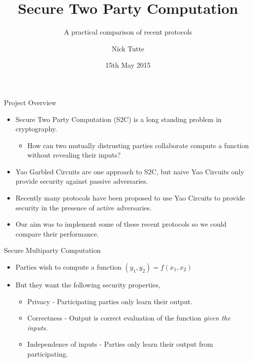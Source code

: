 \documentclass[t, 12pt]{beamer}            %
\title[Secure Two Party Computation]{Secure Two Party Computation}
\subtitle{A practical comparison of recent protocols}
\author{Nick Tutte}
\institute{University of Bristol}
\date{15th May 2015}
\begin{document}
\titlepage

\begin{frame}{Project Overview}
	\begin{itemize} %
		\item Secure Two Party Computation (S2C) is a long standing problem in cryptography.
		\begin{itemize}
			\item How can two mutually distrusting parties collaborate compute a function without revealing their inputs?
		\end{itemize}
		\item Yao Garbled Circuits are one approach to S2C, but naive Yao Circuits only provide security against passive adversaries. 
		\item Recently many protocols have been proposed to use Yao Circuits to provide security in the presence of active adversaries. 
		\item Our aim was to implement some of these recent protocols so we could compare their performance.
	\end{itemize}
\end{frame}


\begin{frame}{Secure Multiparty Computation}
	\begin{itemize} %
		\item Parties wish to compute a function $(y_1, y_2) = f(x_1, x_2)$
		\item But they want the following security properties,
		\begin{itemize}
			\item Privacy - Participating parties only learn their output.
			\item Correctness - Output is correct evaluation of the function \emph{given the inputs}.
			\item Independence of inputs - Parties only learn their output from participating.
		\end{itemize}
	\end{itemize}
\end{frame}
\end{document}
